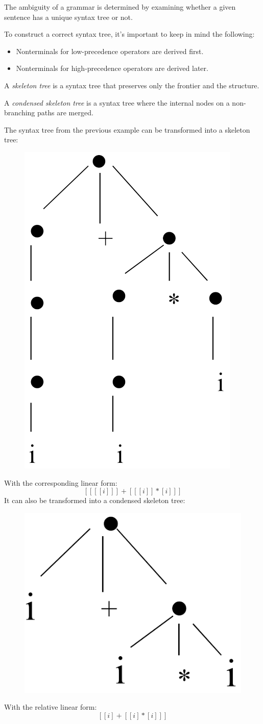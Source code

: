The ambiguity of a grammar is determined by examining whether a given sentence has a unique syntax tree or not.

To construct a correct syntax tree, it's important to keep in mind the following:
\begin{itemize}
    \item Nonterminals for low-precedence operators are derived first.
    \item Nonterminals for high-precedence operators are derived later.
\end{itemize}
\begin{definition}
    A \emph{skeleton tree} is a syntax tree that preserves only the frontier and the structure. 

    A \emph{condensed skeleton tree} is a syntax tree where the internal nodes on a non-branching paths are merged. 
\end{definition}
\begin{example}
    The syntax tree from the previous example can be transformed into a skeleton tree:    \begin{figure}[H]
        \centering
        \includegraphics[width=0.2\linewidth]{images/syntree1.png}
    \end{figure}
    With the corresponding linear form:
    \[[[[[i]]]+[[[i]]*[i]]]\]
    It can also be transformed into a condensed skeleton tree:
    \begin{figure}[H]
        \centering
        \includegraphics[width=0.2\linewidth]{images/syntree2.png}
    \end{figure}
    With the relative linear form:
    \[[[i]+[[i]*[i]]]\]
\end{example}